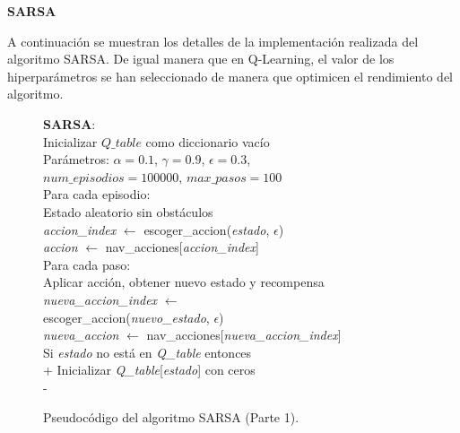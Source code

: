 \documentclass[conference,a4paper]{IEEEtran}
\begin{document}
\textbf{SARSA\newline}

A continuación se muestran los detalles de la implementación realizada del algoritmo SARSA. De igual manera que en Q-Learning, el valor de los hiperparámetros
se han seleccionado de manera que optimicen el rendimiento del algoritmo. 

\begin{figure}[!h]
  \begin{minipage}{\linewidth}
    \begin{pseudo}[compact]
      \textbf{SARSA}: \\
      Inicializar $Q\_table$ como diccionario vacío \\
      Parámetros: $\alpha = 0.1$, $\gamma = 0.9$, $\epsilon = 0.3$, \\ $num\_episodios = 100000$, $max\_pasos = 100$ \\
      Para cada episodio: \\
      \> Estado aleatorio sin obstáculos \\
      \> \textit{accion\_index} $\leftarrow$ escoger\_accion(\textit{estado}, $\epsilon$) \\
      \> \textit{accion} $\leftarrow$ nav\_acciones[\textit{accion\_index}] \\
      \> Para cada paso: \\
      \> \> Aplicar acción, obtener nuevo estado y recompensa \\
      \> \> \textit{nueva\_accion\_index} $\leftarrow$ \\
      \> \> \> escoger\_accion(\textit{nuevo\_estado}, $\epsilon$) \\
      \> \> \textit{nueva\_accion} $\leftarrow$ nav\_acciones[\textit{nueva\_accion\_index}] \\
      Si \textit{estado} no está en \textit{Q\_table} entonces \\+
      Inicializar \textit{Q\_table}[\textit{estado}] con ceros \\-
    \end{pseudo}
  \end{minipage}
  \caption{Pseudocódigo del algoritmo SARSA (Parte 1).}
  \label{fig:sarsa1}
\end{figure}
\end{document}
